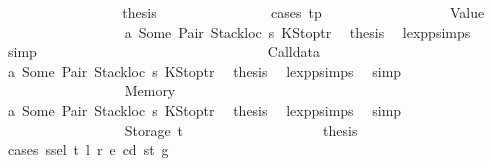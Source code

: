 \begin{isabellebody}
\ \ \ \ \ \ \ \ \ \ \ \ \ \ \isamarkupfalse%
\ \isamarkupfalse%
\ {\isacharquery}{\kern0pt}thesis\isanewline
\ \ \ \ \ \ \ \ \ \ \ \ \ \ \isamarkupfalse%
\ {\isacharparenleft}{\kern0pt}cases\ tp{\isacharparenright}{\kern0pt}\isanewline
\ \ \ \ \ \ \ \ \ \ \ \ \ \ \ \ \isamarkupfalse%
\ {\isacharparenleft}{\kern0pt}Value\ {\isacharunderscore}{\kern0pt}{\isacharparenright}{\kern0pt}\isanewline
\ \ \ \ \ \ \ \ \ \ \ \ \ \ \ \ \isamarkupfalse%
\ a{}\ Some\ Pair\ Stackloc\ s{}\ KStoptr\ \isamarkupfalse%
\ {\isacharquery}{\kern0pt}thesis\ \isamarkupfalse%
\ lexp{\isachardot}{\kern0pt}psimps{\isacharparenleft}{\kern0pt}{}{\isacharparenright}{\kern0pt}\ \isamarkupfalse%
\ simp\isanewline
\ \ \ \ \ \ \ \ \ \ \ \ \ \ \isamarkupfalse%
\isanewline
\ \ \ \ \ \ \ \ \ \ \ \ \ \ \ \ \isamarkupfalse%
\ {\isacharparenleft}{\kern0pt}Calldata\ {\isacharunderscore}{\kern0pt}{\isacharparenright}{\kern0pt}\isanewline
\ \ \ \ \ \ \ \ \ \ \ \ \ \ \ \ \isamarkupfalse%
\ a{}\ Some\ Pair\ Stackloc\ s{}\ KStoptr\ \isamarkupfalse%
\ {\isacharquery}{\kern0pt}thesis\ \isamarkupfalse%
\ lexp{\isachardot}{\kern0pt}psimps{\isacharparenleft}{\kern0pt}{}{\isacharparenright}{\kern0pt}\ \isamarkupfalse%
\ simp\isanewline
\ \ \ \ \ \ \ \ \ \ \ \ \ \ \isamarkupfalse%
\isanewline
\ \ \ \ \ \ \ \ \ \ \ \ \ \ \ \ \isamarkupfalse%
\ {\isacharparenleft}{\kern0pt}Memory\ {\isacharunderscore}{\kern0pt}{\isacharparenright}{\kern0pt}\isanewline
\ \ \ \ \ \ \ \ \ \ \ \ \ \ \ \ \isamarkupfalse%
\ a{}\ Some\ Pair\ Stackloc\ s{}\ KStoptr\ \isamarkupfalse%
\ {\isacharquery}{\kern0pt}thesis\ \isamarkupfalse%
\ lexp{\isachardot}{\kern0pt}psimps{\isacharparenleft}{\kern0pt}{}{\isacharparenright}{\kern0pt}\ \isamarkupfalse%
\ simp\isanewline
\ \ \ \ \ \ \ \ \ \ \ \ \ \ \isamarkupfalse%
\isanewline
\ \ \ \ \ \ \ \ \ \ \ \ \ \ \ \ \isamarkupfalse%
\ {\isacharparenleft}{\kern0pt}Storage\ t{\isacharparenright}{\kern0pt}\isanewline
\ \ \ \ \ \ \ \ \ \ \ \ \ \ \ \ \isamarkupfalse%
\ \isamarkupfalse%
\ {\isacharquery}{\kern0pt}thesis\isanewline
\ \ \ \ \ \ \ \ \ \ \ \ \ \ \ \ \isamarkupfalse%
\ {\isacharparenleft}{\kern0pt}cases\ {\isachardoublequoteopen}ssel\ t\ l{\isacharprime}{\kern0pt}\ r\ e\ cd\ st\ g{\isachardoublequoteclose}{\isacharparenright}{\kern0pt}\isanewline

\end{isabellebody}
